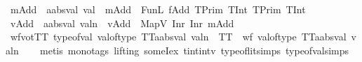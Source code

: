 \begin{isabellebody}
\isamarkupfalse%
\ mAdd{}\ {\isacharcolon}{\kern0pt}{\isacharcolon}{\kern0pt}\ {\isachardoublequoteopen}{\isacharprime}{\kern0pt}a{\isacharcolon}{\kern0pt}{\isacharcolon}{\kern0pt}absval\ val{}{\isachardoublequoteclose}\ \ {\isachardoublequoteopen}mAdd{}\ {\isasymequiv}\ FunL\ fAdd{}\ {\isacharparenleft}{\kern0pt}TPrim\ TInt{\isacharparenright}{\kern0pt}\ {\isacharparenleft}{\kern0pt}TPrim\ TInt{\isacharparenright}{\kern0pt}{\isachardoublequoteclose}\isanewline
{}\isamarkupfalse%
\ vAdd{}\ {\isacharcolon}{\kern0pt}{\isacharcolon}{\kern0pt}\ {\isachardoublequoteopen}{\isacharprime}{\kern0pt}a{\isacharcolon}{\kern0pt}{\isacharcolon}{\kern0pt}absval\ valn{\isachardoublequoteclose}\ \ {\isachardoublequoteopen}vAdd{}\ {\isasymequiv}\ MapV\ {\isacharparenleft}{\kern0pt}Inr\ {\isacharparenleft}{\kern0pt}Inr\ mAdd{}{\isacharparenright}{\kern0pt}{\isacharparenright}{\kern0pt}{\isachardoublequoteclose}\isanewline
\isanewline
{}\isamarkupfalse%
\ wfvotTT{\isacharcolon}{\kern0pt}\ {\isachardoublequoteopen}{\isacharparenleft}{\kern0pt}type{\isacharunderscore}{\kern0pt}of{\isacharunderscore}{\kern0pt}val\ {\isacharparenleft}{\kern0pt}{\isacharparenleft}{\kern0pt}val{\isacharunderscore}{\kern0pt}of{\isacharunderscore}{\kern0pt}type\ TT{\isacharparenright}{\kern0pt}{\isacharcolon}{\kern0pt}{\isacharcolon}{\kern0pt}{\isacharprime}{\kern0pt}a{\isacharcolon}{\kern0pt}{\isacharcolon}{\kern0pt}absval\ valn{\isacharparenright}{\kern0pt}\ {\isacharequal}{\kern0pt}\ TT\ {\isasymand}\ wf\ {\isacharparenleft}{\kern0pt}{\isacharparenleft}{\kern0pt}val{\isacharunderscore}{\kern0pt}of{\isacharunderscore}{\kern0pt}type\ TT{\isacharparenright}{\kern0pt}{\isacharcolon}{\kern0pt}{\isacharcolon}{\kern0pt}{\isacharprime}{\kern0pt}a{\isacharcolon}{\kern0pt}{\isacharcolon}{\kern0pt}absval\ valn{\isacharparenright}{\kern0pt}{\isacharparenright}{\kern0pt}{\isachardoublequoteclose}\isanewline
%
\isadelimproof
\ \ %
\endisadelimproof
%
\isatagproof
{}\isamarkupfalse%
\ {\isacharparenleft}{\kern0pt}metis\ {\isacharparenleft}{\kern0pt}mono{\isacharunderscore}{\kern0pt}tags{\isacharcomma}{\kern0pt}\ lifting{\isacharparenright}{\kern0pt}\ someI{\isacharunderscore}{\kern0pt}ex\ tint{\isacharunderscore}{\kern0pt}intv\ type{\isacharunderscore}{\kern0pt}of{\isacharunderscore}{\kern0pt}lit{\isachardot}{\kern0pt}simps{\isacharparenleft}{\kern0pt}{}{\isacharparenright}{\kern0pt}\ type{\isacharunderscore}{\kern0pt}of{\isacharunderscore}{\kern0pt}val{\isachardot}{\kern0pt}simps{\isacharparenleft}{\kern0pt}{}{\isacharparenright}{\kern0pt}\isanewline

\end{isabellebody}
